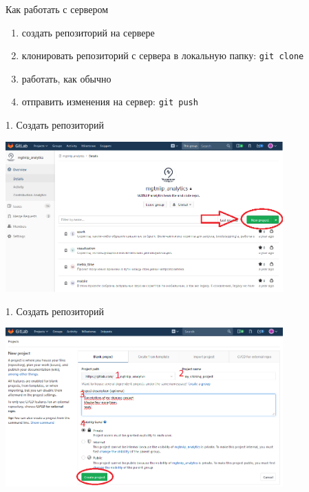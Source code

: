 \documentclass[presentation]{beamer}
\begin{document}
\begin{frame}[fragile,label={sec:org943c376}]{Как работать с сервером}
 \begin{enumerate}
\item создать репозиторий на сервере
\item клонировать репозиторий с сервера в локальную папку: \texttt{git clone}
\item работать, как обычно
\item отправить изменения на сервер: \texttt{git push}
\end{enumerate}
\end{frame}

\begin{frame}[label={sec:org8a2cecd}]{1. Создать репозиторий}
\begin{center}
\includegraphics[width=0.8\textwidth]{./01_vcs_03_remote_create_repo.PNG}
\end{center}
\end{frame}

\begin{frame}[label={sec:org6f8333a}]{1. Создать репозиторий}
\begin{center}
\includegraphics[width=0.8\textwidth]{./01_vcs_03_remote_create_repo_2.PNG}
\end{center}
\end{frame}
\end{document}

